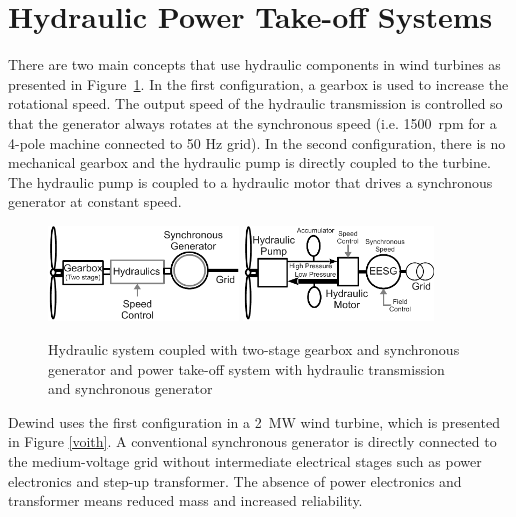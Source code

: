 \documentclass[a4paper, 11pt]{article} %
\begin{document}
\section{Hydraulic Power Take-off Systems}


There are two main concepts that use hydraulic components in wind turbines as presented in Figure~\ref{hydraulics}. In the first configuration, a gearbox is used to increase the rotational speed. The output speed of the hydraulic transmission is controlled so that the generator always rotates at the synchronous speed (i.e. 1500~rpm for a 4-pole machine connected to 50 Hz grid). In the second configuration, there is no mechanical gearbox and the hydraulic pump is directly coupled to the turbine. The hydraulic pump is coupled to a hydraulic motor that drives a synchronous generator at constant speed.

  \begin{figure}
    \centering
    \includegraphics[width=0.45\textwidth]{hydraulics}
    \hfill
    \includegraphics[width=0.45\textwidth]{EESG_hydraulics}
    \caption{Hydraulic system coupled with two-stage gearbox and synchronous generator and power take-off system with hydraulic transmission and synchronous generator } 
    \label{hydraulics}
  \end{figure}

Dewind uses the first configuration in a 2~MW wind turbine, which is presented in Figure \ref{voith}. A conventional synchronous generator is directly connected to the medium-voltage grid without intermediate electrical stages such as power electronics and step-up transformer. The absence of power electronics and transformer means reduced mass and increased reliability.
\end{document}
